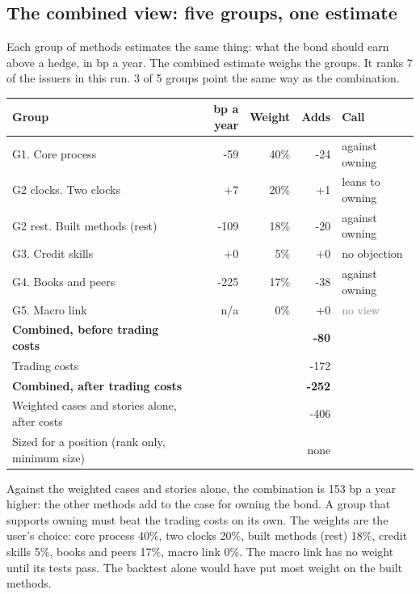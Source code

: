 \documentclass[11pt,a4paper]{article}
\begin{document}
\subsection*{The combined view: five groups, one estimate}
Each group of methods estimates the same thing: what the bond should earn above a hedge, in bp a year. The combined estimate weighs the groups. It ranks 7 of the issuers in this run. 3 of 5 groups point the same way as the combination.
\begin{center}\footnotesize\setlength{\tabcolsep}{3.5pt}\begin{tabular}{@{}lrrrl@{}}\toprule
Group & bp a year & Weight & Adds & Call \\\midrule
G1. Core process & -59 & 40\% & -24 & \textcolor{bad}{against owning} \\
G2 clocks. Two clocks & +7 & 20\% & +1 & \textcolor{amber}{leans to owning} \\
G2 rest. Built methods (rest) & -109 & 18\% & -20 & \textcolor{bad}{against owning} \\
G3. Credit skills & +0 & 5\% & +0 & \textcolor{good}{no objection} \\
G4. Books and peers & -225 & 17\% & -38 & \textcolor{bad}{against owning} \\
G5. Macro link & n/a & 0\% & +0 & \textcolor{gray}{no view} \\
\textbf{Combined, before trading costs} &  &  & \textbf{-80} &  \\
Trading costs &  &  & -172 &  \\
\textbf{Combined, after trading costs} &  &  & \textbf{-252} &  \\
Weighted cases and stories alone, after costs &  &  & -406 &  \\
Sized for a position (rank only, minimum size) &  &  & none &  \\
\bottomrule\end{tabular}\end{center}
Against the weighted cases and stories alone, the combination is 153 bp a year higher: the other methods add to the case for owning the bond. A group that supports owning must beat the trading costs on its own. The weights are the user's choice: core process 40\%, two clocks 20\%, built methods (rest) 18\%, credit skills 5\%, books and peers 17\%, macro link 0\%. The macro link has no weight until its tests pass. The backtest alone would have put most weight on the built methods.
\par\noindent{}
\end{document}
